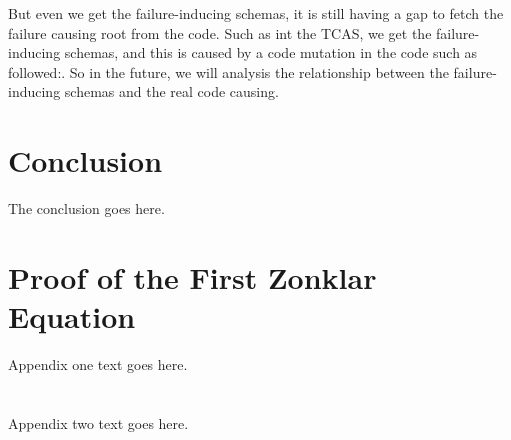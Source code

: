 \documentclass[10pt,journal,cspaper,compsoc]{IEEEtran}
\begin{document}
But even we get the failure-inducing schemas, it is still having a gap to fetch the failure causing root from the code. Such as int the TCAS, we get the failure-inducing schemas, and this is caused by a code mutation in the code such as followed:.  So in the future, we will analysis the relationship between the failure-inducing schemas and the real code causing.


\section{Conclusion}\label{sec:conclusion}
The conclusion goes here.






%


\appendices
\section{Proof of the First Zonklar Equation}
Appendix one text goes here.

\section{}
Appendix two text goes here.
\end{document}

